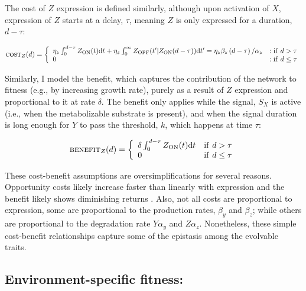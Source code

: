 \documentclass[dvips,12pt,twoside,titlepage]{article}
\newcommand{\ud}{\mathrm{d}}
\begin{document}
The cost of $Z$ expression is defined similarly, although upon activation of $X$, expression of $Z$ starts at a delay, $\tau$, meaning $Z$ is only expressed for a duration, $d - \tau$:

\begin{displaymath}
\textsc{cost}_Z(d) = \left\{ \begin{array}{ll}
\eta_z \int_{0}^{d-\tau} Z_{\mathrm{ON}}(t)\ud t + \eta_z \int_{0}^{\infty} Z_{\mathrm{OFF}}(t'|Z_{\mathrm{ON}}(d-\tau))\ud t' = \eta_z \beta_z \left( d - \tau \right)/\alpha_z & : \mathrm{if}\ d > \tau \\
0 & : \mathrm{if}\ d \le \tau \\
\end{array} \right.
\end{displaymath}

\vspace{0.6cm}

Similarly, I model the benefit, which captures the contribution of the network to fitness (e.g., by increasing growth rate), purely as a result of $Z$ expression and proportional to it at rate $\delta$. The benefit only applies while the signal, $S_X$ is active (i.e., when the metabolizable substrate is present), and when the signal duration is long enough for $Y$ to pass the threshold, $k$, which happens at time $\tau$:

\begin{displaymath}
\textsc{benefit}_Z(d) = \left\{ \begin{array}{ll}
\delta \int_{0}^{d-\tau} Z_{\mathrm{ON}}(t)\ud t & \mathrm{if}\ d > \tau \\
0 & \mathrm{if}\ d \le \tau \\
\end{array} \right.
\end{displaymath}

\vspace{0.6cm}

\noindent These cost-benefit assumptions are oversimplifications for several reasons. Opportunity costs likely increase faster than linearly with expression and the benefit likely shows diminishing returns \cite{Alon:2006tm}. Also, not all costs are proportional to expression, some are proportional to the production rates, $\beta_y$ and $\beta_z$; while others are proportional to the degradation rate $Y \alpha_y$ and $Z \alpha_z$. Nonetheless, these simple cost-benefit relationships capture some of the epistasis among the evolvable traits.

\subsection*{Environment-specific fitness:}
\end{document}
